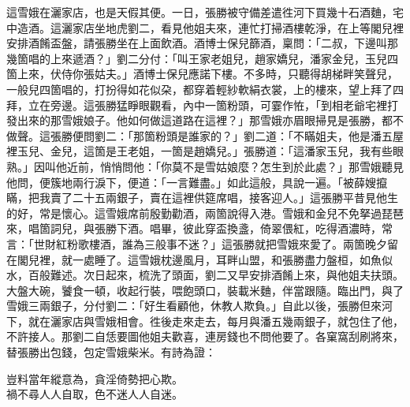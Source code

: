 這雪娥在灑家店，也是天假其便。一日，張勝被守備差遣徃河下買幾十石酒麯，宅中造酒。這灑家店坐地虎劉二，看見他姐夫來，連忙打掃酒樓乾淨，在上等閣兒裡安排酒餚盃盤，請張勝坐在上面飲酒。酒博士保兒篩酒，稟問：「二叔，下邊叫那幾箇唱的上來遞酒？」劉二分付：「叫王家老姐兒，趙家嬌兒，潘家金兒，玉兒四箇上來，伏侍你張姑夫。」酒博士保兒應諾下樓。不多時，只聽得胡梯畔笑聲兒，一般兒四箇唱的，打扮得如花似朶，都穿着輕紗軟絹衣裳，上的樓來，望上拜了四拜，立在旁邊。這張勝猛睜眼觀看，內中一箇粉頭，可霎作恠，「到相老爺宅裡打發出來的那雪娥娘子。他如何做這道路在這裡？」那雪娥亦眉眼掃見是張勝，都不做聲。這張勝便問劉二：「那箇粉頭是誰家的？」劉二道：「不瞞姐夫，他是潘五屋裡玉兒、金兒，這箇是王老姐，一箇是趙嬌兒。」張勝道：「這潘家玉兒，我有些眼熟。」因叫他近前，悄悄問他：「你莫不是雪姑娘麼？怎生到於此處？」那雪娥聽見他問，便簇地兩行淚下，便道：「一言難盡。」如此這般，具說一遍。「被薛嫂攛瞞，把我賣了二十五兩銀子，賣在這裡供筵席唱，接客迎人。」這張勝平昔見他生的好，常是懷心。這雪娥席前殷勤勸酒，兩箇說得入港。雪娥和金兒不免拏過琵琶來，唱箇詞兒，與張勝下酒。唱畢，彼此穿盃換盞，倚翠偎紅，吃得酒濃時，常言：「世財紅粉歌樓酒，誰為三般事不迷？」這張勝就把雪娥來愛了。兩箇晚夕留在閣兒裡，就一處睡了。這雪娥枕邊風月，耳畔山盟，和張勝盡力盤桓，如魚似水，百般難述。次日起來，梳洗了頭面，劉二又早安排酒餚上來，與他姐夫扶頭。大盤大碗，饕食一頓，收起行裝，喂飽頭口，裝載米麯，伴當跟隨。臨出門，與了雪娥三兩銀子，分付劉二：「好生看顧他，休教人欺負。」自此以後，張勝但來河下，就在灑家店與雪娥相會。徃後走來走去，每月與潘五幾兩銀子，就包住了他，不許接人。那劉二自恁要圖他姐夫歡喜，連房錢也不問他要了。各窠窩刮刷將來，替張勝出包錢，包定雪娥柴米。有詩為證：

\begin{myquote}
豈料當年縱意為，貪淫倚勢把心欺。\\禍不尋人人自取，色不迷人人自迷。
\end{myquote}

